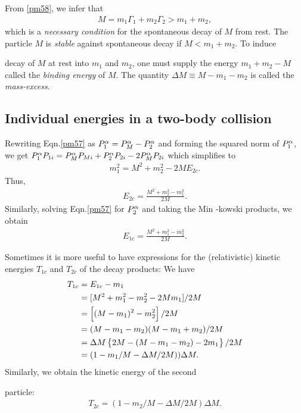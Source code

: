 From \eqref{pm58}, we infer that
\begin{align}\label{pm60}
M=m_1\Gamma_1+m_2\Gamma_2>m_1+m_2,
\end{align}
which is a \textsl{necessary condition} for the 
spontaneous 
decay of $M$ from rest. The particle $M$ is 
\textsl{stable} 
against {spontaneous decay} if $ M<m_1+m_2$. To induce 
 
decay of $M$ at rest into $m_1$ and $m_2$, one must 
supply 
the energy $ m_1+m_2-M $ called the \textsl{binding 
energy} 
of $M$. The quantity $\Delta M \equiv M - m_1-m_2$ is 
called the \textsl{mass-excess}.

\subsection{Individual energies in a two-body collision}
Rewriting  Eqn.\eqref{pm57} as $P^{{\alpha}}_1 = P^{{\alpha}}_M 
-P^{{\alpha}}_2$ and forming the squared norm of $P^{{\alpha}}_1$, 
we get $  P^{{\alpha}}_1 P_{1i} = P^{{\alpha}}_M P_{Mi} + P^{{\alpha}}_2 
P_{2i} - 2 P^{{\alpha}}_M P_{2i}$ which simplifies to
\begin{align}\label{pm61}
m_1^2=M^2 + m_2^2 -2ME_{2c}.
\end{align}
Thus,
\begin{align}\label{pm62}
E_{2c}=\frac{M^2 + m_2^2 -m_1^2}{2M}.
\end{align}
Similarly, solving Eqn.\eqref{pm57} for $P^{{\alpha}}_2$ and 
taking the Min  -kowski  products, we obtain
\begin{align}\label{pm63}
E_{1c}=\frac{M^2 + m_1^2 -m_2^2}{2M}.
\end{align}

Sometimes it is more useful to have expressions for the
(relativistic) kinetic energies $T_{1c}$ and $T_{2c}$ 
of the
decay products:  We have
\begin{align}\label{pm64}
T_{1c}&=E_{1c}-m_1 \notag \\&=[M^2 + m_1^2 -m_2^2
-2Mm_1]/2M \notag \\&=\left[(M-m_1)^2  
-m_2^2\right]/2M\notag
\\&=(M-m_1-m_2) (M-m_1+m_2)/2M\notag \\
&=\Delta M \left\{2M-(M-m_1-m_2) 
-2m_1\right\}/2M\notag\\
&=(1-m_1/M- \Delta M/2M))\Delta M.
\end{align}
Similarly, we  obtain the kinetic energy of the second 
 
particle:
\begin{align}\label{pm65}
T_{2c}=\left( 1-m_2/M - \Delta M/2M\right)\Delta M.
\end{align}

